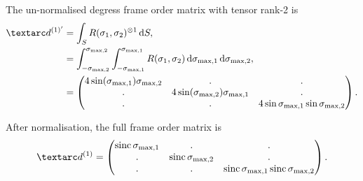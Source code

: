The un-normalised  degress frame order matrix with tensor rank-2 is
\begin{subequations}
\begin{align}
    \FOonep &= \int_S R(\sigma_1, \sigma_2)^{\otimes 1} \diff S, \\
            &= \int_{-\conesmaxtwo}^{\conesmaxtwo} \int_{-\conesmaxone}^{\conesmaxone} R(\sigma_1, \sigma_2) \diff \conesmaxone \diff \conesmaxtwo, \\
            &=
               \begin{pmatrix}
                   4\sin(\conesmaxone)\conesmaxtwo & .                               & . \\
                   .                               & 4\sin(\conesmaxtwo)\conesmaxone & . \\
                   .                               & .                               & 4\sin\conesmaxone\sin\conesmaxtwo
               \end{pmatrix}.
\end{align}
\end{subequations}

After normalisation, the full frame order matrix is
\begin{equation} \label{eq: double rotor 1st degree frame order matrix}
    \FOone =
        \begin{pmatrix}
            \sinc\conesmaxone & .                 & . \\
            .                 & \sinc\conesmaxtwo & . \\
            .                 & .                 & \sinc\conesmaxone\sinc\conesmaxtwo
        \end{pmatrix}.
\end{equation}


